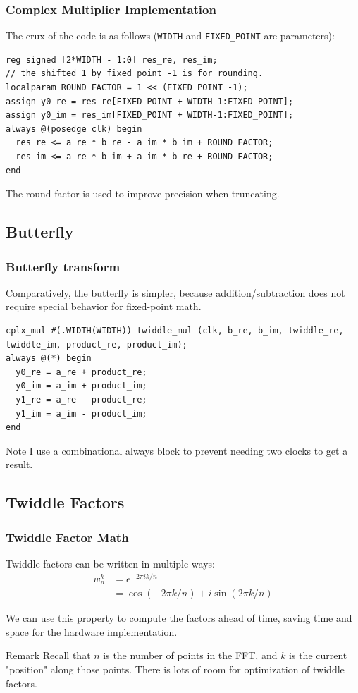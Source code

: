 \documentclass{beamer}
\begin{document}
\begin{frame}[fragile]
	\frametitle{Complex Multiplier Implementation}
	The crux of the code is as follows 
	(\texttt{WIDTH} and \texttt{FIXED\_POINT} are parameters):
\begin{verbatim}
reg signed [2*WIDTH - 1:0] res_re, res_im;
// the shifted 1 by fixed point -1 is for rounding.
localparam ROUND_FACTOR = 1 << (FIXED_POINT -1);
assign y0_re = res_re[FIXED_POINT + WIDTH-1:FIXED_POINT];
assign y0_im = res_im[FIXED_POINT + WIDTH-1:FIXED_POINT];
always @(posedge clk) begin
  res_re <= a_re * b_re - a_im * b_im + ROUND_FACTOR;
  res_im <= a_re * b_im + a_im * b_re + ROUND_FACTOR;
end
\end{verbatim}
The round factor is used to improve precision when truncating.
\end{frame}

\subsection{Butterfly}
\begin{frame}[fragile]
	\frametitle{Butterfly transform}
	Comparatively, the butterfly is simpler, because addition/subtraction does not require
	special behavior for fixed-point math.
\begin{verbatim}
cplx_mul #(.WIDTH(WIDTH)) twiddle_mul (clk, b_re, b_im, twiddle_re, twiddle_im, product_re, product_im);
always @(*) begin
  y0_re = a_re + product_re;
  y0_im = a_im + product_im;
  y1_re = a_re - product_re;
  y1_im = a_im - product_im;
end
\end{verbatim}
\begin{block}{Note}
I use a combinational always block to prevent needing two clocks to get a result.
\end{block}
\end{frame}

\subsection{Twiddle Factors}

\begin{frame}
	\frametitle{Twiddle Factor Math}
	Twiddle factors can be written in multiple ways:
	\begin{align*}
		w_n^k &= e^{-2\pi i k / n} \\
		      &= \cos(-2\pi k / n) + i\sin(2\pi k / n)
	\end{align*}
	\pause

	We can use this property to compute the factors ahead of time, saving
	time and space for the hardware implementation.
	\begin{block}{Remark}
		Recall that $n$ is the number of points in the FFT, and $k$ is
		the current "position" along those points. There is lots of
		room for optimization of twiddle factors.
	\end{block}
\end{frame}
\end{document}
